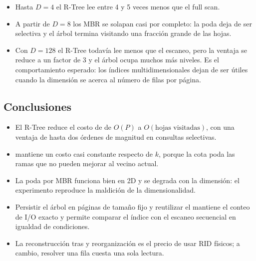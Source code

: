 \begin{itemize}
  \item Hasta \(D=4\) el R-Tree lee entre 4 y 5 veces menos que el full scan.
  \item A partir de \(D=8\) los MBR se solapan casi por completo: la poda deja
        de ser selectiva y el árbol termina visitando una fracción grande de las
        hojas.
  \item Con \(D=128\) el R-Tree todavía lee menos que el escaneo, pero la ventaja
        se reduce a un factor de 3 y el árbol ocupa muchos más niveles. Es el
        comportamiento esperado: los índices multidimensionales dejan de ser
        útiles cuando la dimensión se acerca al número de filas por página.
\end{itemize}

\subsection{Conclusiones}

\begin{itemize}
  \item El R-Tree reduce el costo de  de \(O(P)\) a
        \(O(\text{hojas visitadas})\), con una ventaja de hasta dos órdenes de
        magnitud en consultas selectivas.
  \item {} mantiene un costo casi constante respecto de \(k\), porque la
        cota  poda las ramas que no pueden mejorar al vecino actual.
  \item La poda por MBR funciona bien en 2D y se degrada con la dimensión: el
        experimento reproduce la maldición de la dimensionalidad.
  \item Persistir el árbol en páginas de tamaño fijo y reutilizar el
         mantiene el conteo de I/O exacto y permite comparar el
        índice con el escaneo secuencial en igualdad de condiciones.
  \item La reconstrucción tras  y reorganización es el precio de
        usar RID físicos; a cambio, resolver una fila cuesta una sola lectura.
\end{itemize}

